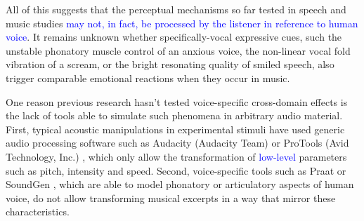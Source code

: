 \documentclass[openacc]{rsprocb_new}%
\begin{document}
All of this suggests that the perceptual mechanisms so far tested in speech and music studies \textcolor{blue}{may not, in fact, be processed by the listener in reference to human voice}. It remains unknown whether specifically-vocal expressive cues, such the unstable phonatory muscle control of an anxious voice, the non-linear vocal fold vibration of a scream, or the bright resonating quality of smiled speech, also trigger comparable emotional reactions when they occur in music. 

One reason previous research hasn't tested voice-specific cross-domain effects is the lack of tools able to simulate such phenomena in arbitrary audio material. First, typical acoustic manipulations in experimental stimuli have used generic audio processing software such as Audacity (Audacity Team) or ProTools (Avid Technology, Inc.) \cite{ilie2006comparison,MA15}, which only allow the transformation of \textcolor{blue}{low-level} parameters such as  pitch, intensity and speed. Second, voice-specific tools such as Praat \cite{BOE01} or SoundGen \cite{ANI19}, which are able to model phonatory or articulatory aspects of human voice, do not allow transforming musical excerpts in a way that mirror these characteristics. 
\end{document}
